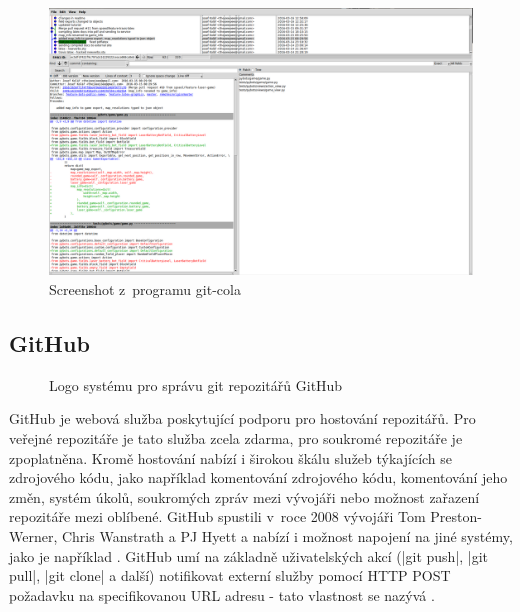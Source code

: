 \begin{figure}[H]
	\centering
	\begin{minipage}{.9\textwidth}
 		\centering
 		\includegraphics[width=.9\textwidth]{assets/git-cola-screenshot}
 		\caption{Screenshot z~programu git-cola}
 		\label{fig:git-cola}
 	\end{minipage}
\end{figure}

\subsection{GitHub}

\begin{figure}
 	\centering
 	
 	\caption{Logo systému pro správu git repozitářů GitHub}
\end{figure}

GitHub je webová služba poskytující podporu pro hostování  repozitářů. Pro veřejné repozitáře je tato služba zcela zdarma, pro soukromé repozitáře je zpoplatněna\cite{github-docs}. Kromě hostování nabízí i širokou škálu služeb týkajících se zdrojového kódu, jako například komentování zdrojového k\'{o}du, komentování jeho změn, systém úkolů, soukromých zpráv mezi vývojáři nebo možnost zařazení repozitáře mezi oblíbené. GitHub spustili v~roce 2008 vývojáři Tom Preston-Werner, Chris Wanstrath a PJ Hyett a nabízí i možnost napojení na jiné systémy, jako je například . GitHub umí na základně uživatelských akcí (\ic|git push|, \ic|git pull|, \ic|git clone| a další) notifikovat externí služby pomocí HTTP POST požadavku na specifikovanou URL adresu - tato vlastnost se nazývá .

